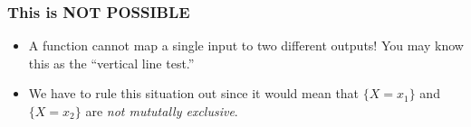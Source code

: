 \documentclass[handout]{beamer}
\begin{document}
\begin{frame}
\frametitle{This is NOT POSSIBLE}

\begin{figure}
\centering
{}
\end{figure}

\begin{itemize}
	\item A function cannot map a single input to two different outputs! You may know this as the ``vertical line test.''
	\item We have to rule this situation out since it would mean that $\{X = x_1\}$ and $\{X = x_2\}$ are \emph{not mututally exclusive}.
\end{itemize}

\end{frame}
\end{document}
